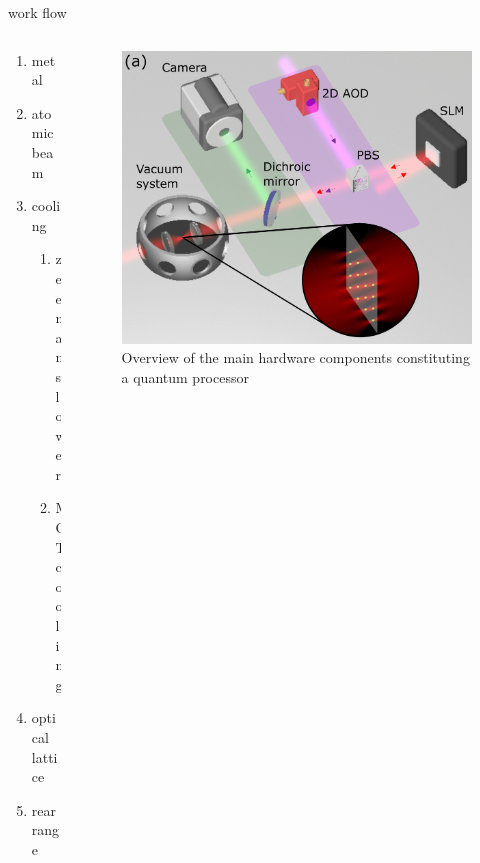 \documentclass[18 pt]{beamer}
\begin{document}
\begin{frame}{work flow}
\begin{columns}
  \begin{column}{.3\textwidth}
    \begin{enumerate}[itemsep = 10pt]
      \item metal
      \item atomic beam
      \item cooling
      \begin{enumerate}[itemsep = 5pt]
        \item zeeman slower
        \item MOT cooling
      \end{enumerate}
      \item optical lattice
      \item rearrange
    \end{enumerate}
  \end{column}
  \begin{column}{.7\textwidth}
    \begin{figure}
      \includegraphics[width=.9\textwidth]{IMG/image.png}
      \caption{Overview of the main hardware components constituting a quantum processor}
    \end{figure}
  \end{column}
\end{columns}
\end{frame}
\end{document}
